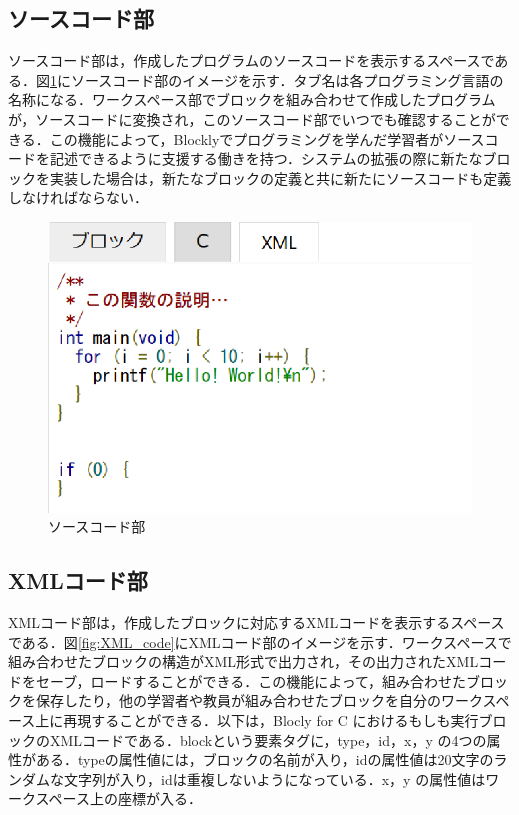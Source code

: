 \documentclass{risepaper}
\begin{document}
   \subsection{ソースコード部}
   
ソースコード部は，作成したプログラムのソースコードを表示するスペースである．図\ref{fig:source_code}にソースコード部のイメージを示す．タブ名は各プログラミング言語の名称になる．ワークスペース部でブロックを組み合わせて作成したプログラムが，ソースコードに変換され，このソースコード部でいつでも確認することができる．この機能によって，Blocklyでプログラミングを学んだ学習者がソースコードを記述できるように支援する働きを持つ．システムの拡張の際に新たなブロックを実装した場合は，新たなブロックの定義と共に新たにソースコードも定義しなければならない．

\begin{figure}[h]
\begin{center}
\includegraphics[scale=0.5]{img/source_code.eps}
\caption{ソースコード部}%
\label{fig:source_code}
\end{center}%
\end{figure}%

   \subsection{XMLコード部}
   
XMLコード部は，作成したブロックに対応するXMLコードを表示するスペースである．図\ref{fig:XML_code}にXMLコード部のイメージを示す．ワークスペースで組み合わせたブロックの構造がXML形式で出力され，その出力されたXMLコードをセーブ，ロードすることができる．この機能によって，組み合わせたブロックを保存したり，他の学習者や教員が組み合わせたブロックを自分のワークスペース上に再現することができる．以下は，Blocly for C におけるもしも実行ブロックのXMLコードである．blockという要素タグに，type，id，x，y の4つの属性がある．typeの属性値には，ブロックの名前が入り，idの属性値は20文字のランダムな文字列が入り，idは重複しないようになっている．x，y の属性値はワークスペース上の座標が入る．
\end{document}
